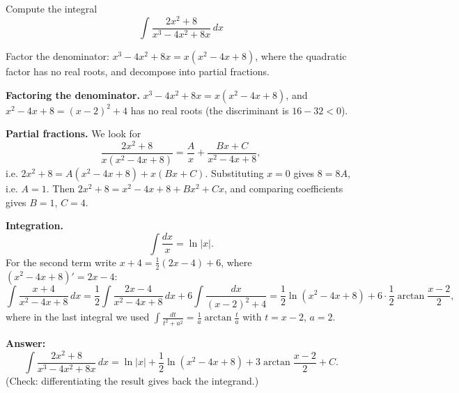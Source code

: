 
\begin{question}
Compute the integral
\[ \int \frac{2x^2 + 8}{x^3 - 4x^2 + 8x}\,dx \]
\end{question}

\begin{hint}
Factor the denominator: $x^3 - 4x^2 + 8x = x(x^2 - 4x + 8)$, where the quadratic factor has no real roots, and decompose into partial fractions.
\end{hint}

\begin{solution}
\textbf{Factoring the denominator.} $x^3 - 4x^2 + 8x = x(x^2 - 4x + 8)$, and $x^2 - 4x + 8 = (x-2)^2 + 4$ has no real roots (the discriminant is $16 - 32 < 0$).

\textbf{Partial fractions.} We look for
\[ \frac{2x^2 + 8}{x(x^2 - 4x + 8)} = \frac{A}{x} + \frac{Bx + C}{x^2 - 4x + 8}, \]
i.e. $2x^2 + 8 = A(x^2 - 4x + 8) + x(Bx + C)$. Substituting $x = 0$ gives $8 = 8A$, i.e. $A = 1$. Then
$2x^2 + 8 = x^2 - 4x + 8 + Bx^2 + Cx$, and comparing coefficients gives $B = 1$, $C = 4$.

\textbf{Integration.}
\[ \int\frac{dx}{x} = \ln|x|. \]
For the second term write $x + 4 = \frac12(2x - 4) + 6$, where $(x^2 - 4x + 8)' = 2x - 4$:
\[ \int\frac{x+4}{x^2-4x+8}\,dx = \frac12\int\frac{2x-4}{x^2-4x+8}\,dx + 6\int\frac{dx}{(x-2)^2 + 4}
= \frac12\ln(x^2-4x+8) + 6\cdot\frac12\arctan\frac{x-2}{2}, \]
where in the last integral we used $\int\frac{dt}{t^2 + a^2} = \frac1a\arctan\frac ta$ with $t = x-2$, $a = 2$.

\textbf{Answer:}
\[ \int \frac{2x^2 + 8}{x^3 - 4x^2 + 8x}\,dx = \ln|x| + \frac12\ln(x^2 - 4x + 8) + 3\arctan\frac{x-2}{2} + C. \]
(Check: differentiating the result gives back the integrand.)
\end{solution}
